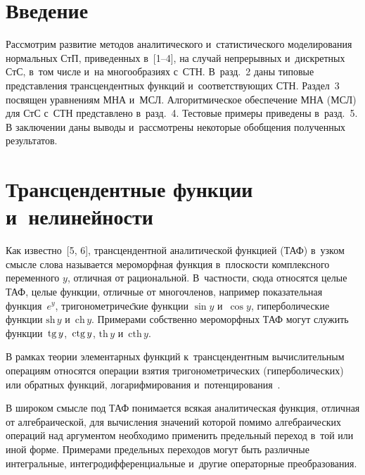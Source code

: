 
\vspace*{-2pt}



\thispagestyle{headings}

\begin{multicols}{2}

\label{st\stat}

\section{Введение}

Рассмотрим развитие методов аналитического и~статистического моделирования нормальных СтП, приведенных в~[1--4], на случай непрерывных и~дискретных СтС, в~том числе и~на многообразиях с~СТН. В~разд.~2 даны типовые представления трансцендентных функций и~соответствующих  СТН. Раздел~3 посвящен уравнениям МНА и~МСЛ. Алгоритмическое обеспечение МНА (МСЛ) для СтС с~СТН представлено в~разд.~4. Тестовые примеры приведены в~разд.~5. В заключении даны выводы и~рассмотрены некоторые обобщения полученных результатов.

\vspace*{-6pt}

\section{Трансцендентные функции и~нелинейности}

Как известно~[5, 6], трансцендентной аналитической функцией (ТАФ) в~узком смысле слова называется мероморфная функция в~плоскости комплексного переменного $y$, отличная от рациональной. В~частности, сюда относятся целые ТАФ, целые функции, отличные от многочленов, например показательная функция~$e^y$, три\-го\-но\-мет\-ри\-че\=ские функции $\sin y$ и~$\cos y$, гиперболические функции  $\mathrm{sh}\, y$ и~$\mathrm{ch}\, y$. Примерами собственно мероморфных ТАФ могут служить функции
$\,\mathrm{tg}\, y$, $\,\mathrm{ctg}\, y$, $\mathrm{th}\, y$ и~$\mathrm{cth}\, y$.

В рамках теории элементарных функций к~трансцендентным вычислительным операциям относятся операции взятия тригонометрических (гиперболических) или обратных функций, логарифмирования и~потенцирования~\cite{5-s}.

В широком смысле под ТАФ понимается всякая аналитическая функция, отличная от алгебраической, для вычисления значений которой помимо алгебраических операций над аргументом необходимо применить предельный переход в~той или иной форме. Примерами предельных переходов могут быть различные интегральные, интегродифференциальные
и~другие операторные преобразования.


\end{multicols}
